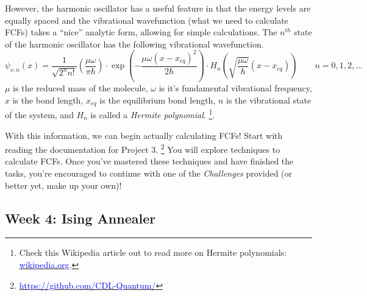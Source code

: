 \documentclass[12pt]{article}
\begin{document}
However, the harmonic oscillator has a useful feature in that the energy levels are equally spaced and the vibrational wavefunction (what we need to calculate FCFs) takes a ``nice'' analytic form, allowing for simple calculations. The $n^{th}$ state of the harmonic oscillator has the following vibrational wavefunction.
\begin{equation}
    \psi_{v,n}(x) = \frac{1}{\sqrt{2^nn!}}\left(\frac{\mu\omega}{\pi\hbar}\right)\cdot\exp\left(-\frac{\mu\omega (x-x_{eq})^2}{2\hbar}\right)\cdot H_n\left(\sqrt{\frac{\mu\omega}{\hbar}}(x-x_{eq})\right) \qquad n=0,1,2,...
\end{equation}
$\mu$ is the reduced mass of the molecule, $\omega$ is it's fundamental vibrational frequency, $x$ is the bond length, $x_{eq}$ is the equilibrium bond length, $n$ is the vibrational state of the system, and $H_n$ is called a {\it Hermite polynomial}. \footnote{Check this Wikipedia article out to read more on Hermite polynomials: \href{https://en.wikipedia.org/wiki/Hermite_polynomials}{\textcolor{blue}{wikipedia.org}}.}.

With this information, we can begin actually calculating FCFs! Start with reading the documentation for Project 3.
\footnote{\href{https://github.com/CDL-Quantum/CohortProject_2020/tree/master/Project_3_Franck_Condon_Factors}
    {\textcolor{blue}{https://github.com/CDL-Quantum/}}}
You will explore techniques to calculate FCFs.
Once you've mastered these techniques and have finished the tasks, you're encouraged to continue with one of the {\it Challenges} provided (or better yet, make up your own)!

\newpage

\subsection{Week 4: Ising Annealer}

\newpage



\end{document}
